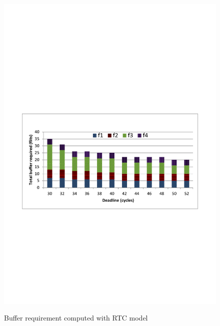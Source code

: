 \documentclass[preprint]{elsarticle}
\begin{document}
\begin{figure}
  \centering
  \includegraphics[scale=0.7]{figures/bufopt.pdf}\\
  \caption{Buffer requirement computed with RTC model}\label{LLBAvsRTC}
\end{figure}
\end{document}
